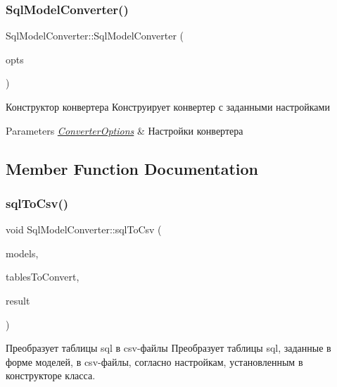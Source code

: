 \subsubsection{\texorpdfstring{Sql\+Model\+Converter()}{SqlModelConverter()}\hspace{0.1cm}{\footnotesize\ttfamily [2/2]}}
{\footnotesize\ttfamily Sql\+Model\+Converter\+::\+Sql\+Model\+Converter (\begin{DoxyParamCaption}\item[{\hyperlink{class_converter_options}{Converter\+Options}}]{opts }\end{DoxyParamCaption})}



Конструктор конвертера Конструирует конвертер с заданными настройками 


\begin{DoxyParams}{Parameters}
{\em \hyperlink{class_converter_options}{Converter\+Options}} & Настройки конвертера \\
\hline
\end{DoxyParams}


\subsection{Member Function Documentation}
\mbox{\label{class_sql_model_converter_a0c4361920533685590697c2bd689157b}} 
\subsubsection{\texorpdfstring{sql\+To\+Csv()}{sqlToCsv()}}
{\footnotesize\ttfamily void Sql\+Model\+Converter\+::sql\+To\+Csv (\begin{DoxyParamCaption}\item[{const Q\+Vector$<$ Q\+Sql\+Table\+Model $\ast$$>$ \&\&}]{models,  }\item[{const Q\+String\+List \&}]{tables\+To\+Convert,  }\item[{Q\+Hash$<$ Q\+String, Q\+String $>$ \&}]{result }\end{DoxyParamCaption})}



Преобразует таблицы sql в csv-\/файлы Преобразует таблицы sql, заданные в форме моделей, в csv-\/файлы, согласно настройкам, установленным в конструкторе класса. 



